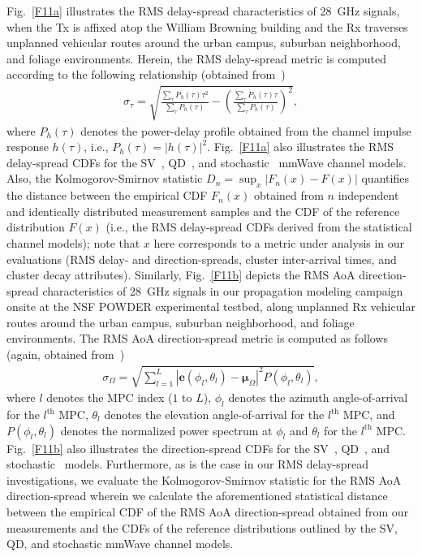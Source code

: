 \documentclass[10pt, twocolumn]{IEEEtran}
\begin{document}
{Fig.~\ref{F11a} illustrates the RMS delay-spread characteristics of \SI{28}{\giga\hertz} signals, when the Tx is affixed atop the William Browning building and the Rx traverses unplanned vehicular routes around the urban campus, suburban neighborhood, and foliage environments. Herein, the RMS delay-spread metric is computed according to the following relationship (obtained from~\cite{Indoor60G})
\begin{align}\label{RMS_DS}
    \sigma_{\tau} = \sqrt{\frac{\sum_{\tau}P_{h}(\tau)\tau^{2}}{\sum_{\tau}P_{h}(\tau)} - \left(\frac{\sum_{\tau}P_{h}(\tau)\tau}{\sum_{\tau}P_{h}(\tau)}\right)^{2}},
\end{align}
where $P_{h}(\tau)$ denotes the power-delay profile obtained from the channel impulse response $h(\tau)$, i.e., $P_{h}(\tau){=}|h(\tau)|^{2}$. Fig.~\ref{F11a} also illustrates the RMS delay-spread CDFs for the SV~\cite{SV_Molisch}, QD~\cite{QDC_NIST}, and stochastic~\cite{Indoor60G} mmWave channel models. Also, the Kolmogorov-Smirnov statistic $D_{n}{=}\sup_{x}|F_{n}(x){-}F(x)|$ quantifies the distance between the empirical CDF $F_{n}(x)$ obtained from $n$ independent and identically distributed measurement samples and the CDF of the reference distribution $F(x)$ (i.e., the RMS delay-spread CDFs derived from the statistical channel models); note that $x$ here corresponds to a metric under analysis in our evaluations (RMS delay- and direction-spreads, cluster inter-arrival times, and cluster decay attributes). Similarly, Fig.~\ref{F11b} depicts the RMS AoA direction-spread characteristics of \SI{28}{\giga\hertz} signals in our propagation modeling campaign onsite at the NSF POWDER experimental testbed, along unplanned Rx vehicular routes around the urban campus, suburban neighborhood, and foliage environments. The RMS AoA direction-spread metric is computed as follows (again, obtained from~\cite{Indoor60G})
\begin{align}\label{RMS_DirS}
    \sigma_{\Omega} = \sqrt{\sum_{l=1}^{L}|\mathbf{e}(\phi_{l}, \theta_{l}) - \boldsymbol{\mu}_{\Omega}|^{2}P(\phi_{l}, \theta_{l})},
\end{align}
where $l$ denotes the MPC index ($1$ to $L$), $\phi_{l}$ denotes the azimuth angle-of-arrival for the $l^{\mathrm{th}}$ MPC, $\theta_{l}$ denotes the elevation angle-of-arrival for the $l^{\mathrm{th}}$ MPC, and $P(\phi_{l}, \theta_{l})$ denotes the normalized power spectrum at $\phi_{l}$ and $\theta_{l}$ for the $l^{\mathrm{th}}$ MPC. Fig.~\ref{F11b} also illustrates the direction-spread CDFs for the SV~\cite{SV_Molisch}, QD~\cite{QDC_NIST}, and stochastic~\cite{Indoor60G} models. Furthermore, as is the case in our RMS delay-spread investigations, we evaluate the Kolmogorov-Smirnov statistic for the RMS AoA direction-spread wherein we calculate the aforementioned statistical distance between the empirical CDF of the RMS AoA direction-spread obtained from our measurements and the CDFs of the reference distributions outlined by the SV, QD, and stochastic mmWave channel models.
}
\end{document}
